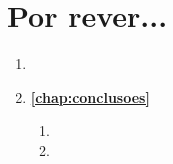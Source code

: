 \section{Por rever...}

\begin{enumerate}
	\item {}
	\item \textbf{\autoref{chap:conclusoes}}
		\begin{enumerate}
			\item {}
			\item {}
		\end{enumerate}
\end{enumerate}